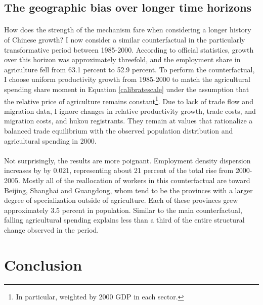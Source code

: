 \documentclass[]{article}
\theoremstyle{plain}
\begin{document}
\subsection*{The geographic bias over longer time horizons}
\paragraph*{}
How does the strength of the mechanism fare when considering a longer history of Chinese growth? I now consider a similar counterfactual in the particularly transformative period between 1985-2000. According to official statistics, growth over this horizon was approximately threefold, and the employment share in agriculture fell from 63.1 percent to 52.9 percent. To perform the counterfactual, I choose uniform productivity growth from 1985-2000 to match the  agricultural spending share moment in Equation \eqref{calibratescale} under the assumption that the relative price of agriculture remains constant\footnote{In particular, weighted by 2000 GDP in each sector.}. Due to lack of trade flow and migration data, I ignore changes in relative productivity growth, trade costs, and migration costs, and hukou registrants. They remain at values that rationalize a balanced trade equilibrium with the observed population distribution and agricultural spending in 2000.  
\paragraph*{}
Not surprisingly, the results are more poignant. Employment density dispersion increases by by 0.021, representing about 21 percent of the total rise from 2000-2005. Mostly all of the reallocation of workers in this counterfactual are toward Beijing, Shanghai and Guangdong, whom tend to be the provinces with a larger degree of specialization outside of agriculture. Each of these provinces grew approximately 3.5 percent in population. Similar to the main counterfactual, falling agricultural spending explains less than a third of the entire structural change observed in the period.


\section{Conclusion}\label{section:conclusion}
\end{document}

